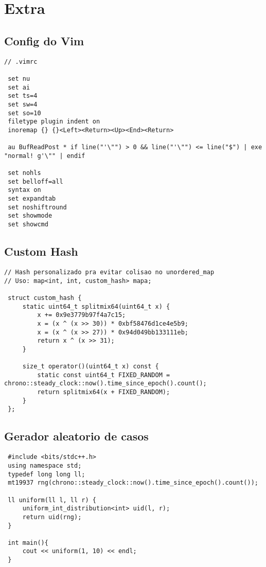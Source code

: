 \documentclass[11pt, a4paper, twoside]{article}
\begin{document}
\pagebreak


%
%

\section{Extra}

\subsection{Config do Vim}
\begin{lstlisting}
// .vimrc

 set nu
 set ai
 set ts=4
 set sw=4
 set so=10
 filetype plugin indent on
 inoremap {} {}<Left><Return><Up><End><Return> 
 
 au BufReadPost * if line("'\"") > 0 && line("'\"") <= line("$") | exe "normal! g'\"" | endif
 
 set nohls
 set belloff=all
 syntax on
 set expandtab
 set noshiftround
 set showmode
 set showcmd
\end{lstlisting}

\subsection{Custom Hash}
\begin{lstlisting}
// Hash personalizado pra evitar colisao no unordered_map
// Uso: map<int, int, custom_hash> mapa;

 struct custom_hash {
     static uint64_t splitmix64(uint64_t x) {
         x += 0x9e3779b97f4a7c15;
         x = (x ^ (x >> 30)) * 0xbf58476d1ce4e5b9;
         x = (x ^ (x >> 27)) * 0x94d049bb133111eb;
         return x ^ (x >> 31);
     }
 
     size_t operator()(uint64_t x) const {
         static const uint64_t FIXED_RANDOM = chrono::steady_clock::now().time_since_epoch().count();
         return splitmix64(x + FIXED_RANDOM);
     }
 };
\end{lstlisting}

\subsection{Gerador aleatorio de casos}
\begin{lstlisting}
 #include <bits/stdc++.h>
 using namespace std;
 typedef long long ll;
 mt19937 rng(chrono::steady_clock::now().time_since_epoch().count());
 
 ll uniform(ll l, ll r) {
     uniform_int_distribution<int> uid(l, r);
     return uid(rng);
 }
 
 int main(){
     cout << uniform(1, 10) << endl;
 }
\end{lstlisting}
\end{document}

